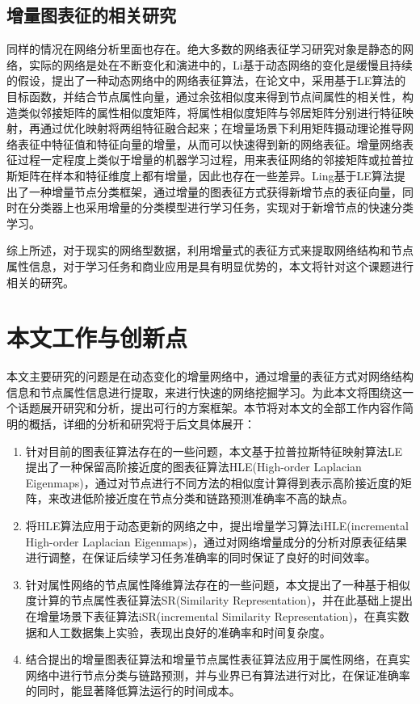 \subsection {增量图表征的相关研究}
同样的情况在网络分析里面也存在。绝大多数的网络表征学习研究对象是静态的网络，实际的网络是处在不断变化和演进中的，Li\cite{li2017attributed}基于动态网络的变化是缓慢且持续的假设，提出了一种动态网络中的网络表征算法，在论文中，采用基于LE算法的目标函数，并结合节点属性向量，通过余弦相似度来得到节点间属性的相关性，构造类似邻接矩阵的属性相似度矩阵，将属性相似度矩阵与邻居矩阵分别进行特征映射，再通过优化映射将两组特征融合起来；在增量场景下利用矩阵摄动理论推导网络表征中特征值和特征向量的增量，从而可以快速得到新的网络表征。增量网络表征过程一定程度上类似于增量的机器学习过程，用来表征网络的邻接矩阵或拉普拉斯矩阵在样本和特征维度上都有增量，因此也存在一些差异。Ling\cite{jian2018toward}基于LE算法提出了一种增量节点分类框架，通过增量的图表征方式获得新增节点的表征向量，同时在分类器上也采用增量的分类模型进行学习任务，实现对于新增节点的快速分类学习。

综上所述，对于现实的网络型数据，利用增量式的表征方式来提取网络结构和节点属性信息，对于学习任务和商业应用是具有明显优势的，本文将针对这个课题进行相关的研究。




\section{本文工作与创新点}
本文主要研究的问题是在动态变化的增量网络中，通过增量的表征方式对网络结构信息和节点属性信息进行提取，来进行快速的网络挖掘学习。为此本文将围绕这一个话题展开研究和分析，提出可行的方案框架。本节将对本文的全部工作内容作简明的概括，详细的分析和研究将于后文具体展开：


\begin{enumerate}
	\item 针对目前的图表征算法存在的一些问题，本文基于拉普拉斯特征映射算法LE提出了一种保留高阶接近度的图表征算法HLE(High-order Laplacian Eigenmaps)，通过对节点进行不同方法的相似度计算得到表示高阶接近度的矩阵，来改进低阶接近度在节点分类和链路预测准确率不高的缺点。
	\item 将HLE算法应用于动态更新的网络之中，提出增量学习算法iHLE(incremental High-order Laplacian Eigenmaps)，通过对网络增量成分的分析对原表征结果进行调整，在保证后续学习任务准确率的同时保证了良好的时间效率。
	\item 针对属性网络的节点属性降维算法存在的一些问题，本文提出了一种基于相似度计算的节点属性表征算法SR(Similarity Representation)，并在此基础上提出在增量场景下表征算法iSR(incremental Similarity Representation)，在真实数据和人工数据集上实验，表现出良好的准确率和时间复杂度。
	\item 结合提出的增量图表征算法和增量节点属性表征算法应用于属性网络，在真实网络中进行节点分类与链路预测，并与业界已有算法进行对比，在保证准确率的同时，能显著降低算法运行的时间成本。
\end{enumerate}






